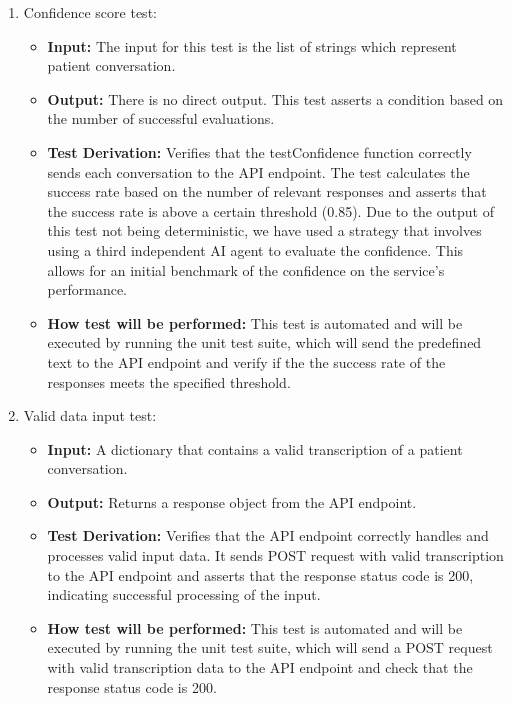 \documentclass[12pt, titlepage]{article}
\begin{document}
\begin{enumerate}
  \item Confidence score test:
    \begin{itemize}
      \item \textbf{Input:} The input for this test is the list of strings which represent patient conversation.   
      \item \textbf{Output:} There is no direct output. This test asserts a condition based on the number of successful evaluations.
      \item \textbf{Test Derivation:} Verifies that the testConfidence function correctly sends each conversation to the API endpoint. The test calculates the success rate based on the number of relevant responses and asserts that the success rate is above a certain threshold (0.85). Due to the output of this test not being deterministic, we have used a strategy that involves using a third independent AI agent to evaluate the confidence. This allows for an initial benchmark of the confidence on the service's performance. 
      \item \textbf{How test will be performed:} This test is automated and will be executed by running the unit test suite, which will send the predefined text to the API endpoint and verify if the the success rate of the responses meets the specified threshold.
    \end{itemize}

  \item Valid data input test:
    \begin{itemize}
      \item \textbf{Input:} A dictionary that contains a valid transcription of a patient conversation. 
      \item \textbf{Output:} Returns a response object from the API endpoint.
      \item \textbf{Test Derivation:} Verifies that the API endpoint correctly handles and processes valid input data. It sends POST request with valid transcription to the API endpoint and asserts that the response status code is 200, indicating successful processing of the input.
      \item \textbf{How test will be performed:} This test is automated and will be executed by running the unit test suite, which will send a POST request with valid transcription data to the API endpoint and check that the response status code is 200.
    \end{itemize}


\end{enumerate}
\end{document}
